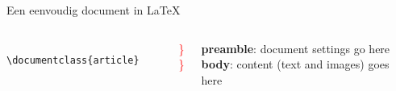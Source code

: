 \begin{frame}[fragile, t]{Een eenvoudig document in \LaTeX}
	\begin{columns}[t]
        \begin{column}{0.6\textwidth}
			\vspace{-20pt}
	\begin{verbatim} 
	\documentclass{article}


	
	







	
	\end{verbatim}

	\phantom{\tiny
	Example text: ``Elementary Illustrations of the Differential and Integral Calculus''
	by Augustus De Morgan
	}\par
\end{column}
\begin{column}{0.05\textwidth}
	\vspace{0pt}

	{\Huge \textcolor{red}{ \} } }\\[1.5cm]
	{\Huge \textcolor{red}{ \} } }
\end{column}
\begin{column}{0.3\textwidth}
	\vspace{0pt}

	\leavevmode\textbf{preamble}: document settings go here\\[1.5cm]
	\textbf{body}: content (text and images) goes here
\end{column}
\end{columns}

\end{frame}